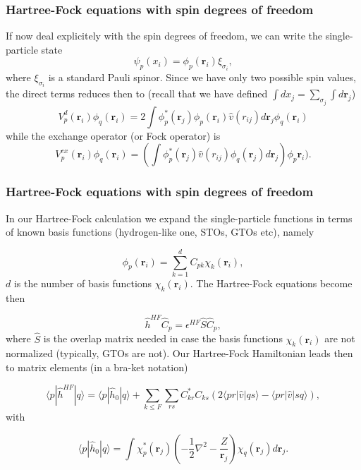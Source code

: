 \documentclass{beamer}
\begin{document}
\begin{frame}
\frametitle{Hartree-Fock equations with spin degrees of freedom}

\begin{block}{}
If now deal explicitely with the spin degrees of freedom, we can write the single-particle state
\[
\psi_{p}(x_i) = \phi_{p}(\mathbf{r}_i)\xi_{\sigma_i},
\]
where $\xi_{\sigma_i}$ is a standard Pauli spinor. Since we have only two possible spin values, the direct terms reduces then to
(recall that we have defined $\int dx_j = \sum_{\sigma_j} \int d \mathbf{r}_j$)
\[
  V_{p}^{d}(\mathbf{r}_i)\phi_{q}(\mathbf{r}_i) = 2\int \phi_{p}^*(\mathbf{r}_j)\phi_{p}(\mathbf{r}_i)\hat{v}(r_{ij}) d\mathbf{r}_j\phi_{q}(\mathbf{r}_i)
\]
while the exchange operator (or Fock operator) is
\[
  V_{p}^{ex}(\mathbf{r}_i) \phi_{q}(\mathbf{r}_i) = \left(\int \phi_{p}^*(\mathbf{r}_j) 
  \hat{v}(r_{ij})\phi_{q}(\mathbf{r}_j)
  d\mathbf{r}_j\right)\phi_{p}\mathbf{r}_i).
\]
\end{block}
\end{frame}

\begin{frame}
\frametitle{Hartree-Fock equations with spin degrees of freedom}

\begin{block}{}

In our Hartree-Fock calculation we expand the single-particle functions in terms of known basis functions (hydrogen-like one, STOs, GTOs etc), namely

\begin{equation*}
\phi_{p}(\mathbf{r}_i) = \sum_{k=1}^{d}C_{pk}\chi_k(\mathbf{r}_i),
\end{equation*}
$d$ is the number of basis functions $\chi_k(\mathbf{r}_i)$. The Hartree-Fock equations become then

\begin{equation*}
\hat{h}^{HF}\hat{C}_p=\epsilon^{HF}\hat{S}\hat{C}_p,
\end{equation*}
where $\hat{S}$ is the overlap matrix needed in case the basis functions $\chi_k(\mathbf{r}_i)$ are not normalized (typically, GTOs are not). 
Our Hartree-Fock Hamiltonian leads then to matrix elements (in a bra-ket notation)

\[
\langle p | \hat{h}^{HF} | q \rangle = \langle p|\hat{h}_0|q\rangle +\sum_{k\le F}\sum_{rs}C_{kr}^*C_{ks}\left(2\langle pr | \hat{v}|qs\rangle-\langle pr | \hat{v}|sq\rangle\right),
\]
with

\[
\langle p|\hat{h}_0|q\rangle = \int \chi_{p}^*(\mathbf{r}_j)\left(-\frac{1}{2}\nabla^2-\frac{Z}{\mathbf{r}_j}  \right)\chi_{q}(\mathbf{r}_j)
  d\mathbf{r}_j.
\]
\end{block}
\end{frame}
\end{document}
